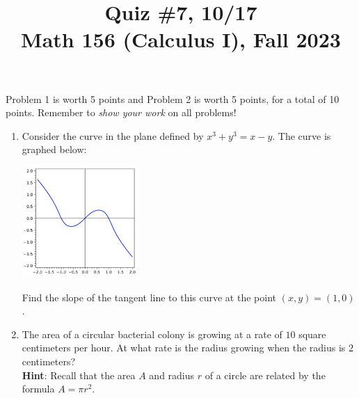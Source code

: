 \documentclass[11pt]{article}
\title{Quiz \#7, 10/17 \\ Math 156 (Calculus I), Fall 2023}
\date{}
\begin{document}
\maketitle

\thispagestyle{empty}

\vspace{-1.75cm}

Problem 1 is worth 5 points and Problem 2 is worth 5 points, for a total of 10 points. Remember to \emph{show your work} on all problems!

\begin{enumerate}
\item Consider the curve in the plane defined by $x^3 + y^3 = x - y$. The curve is graphed below:
\vspace{-0.45cm}
\begin{center}\includegraphics[width=1.75in]{quiz7.png}\end{center}
\vspace{-0.7cm}
Find the slope of the tangent line to this curve at the point $(x,y)=(1,0)$.

\vspace{6.75cm}

\item The area of a circular bacterial colony is growing at a rate of $10$ square centimeters per hour. At what rate is the radius growing when the radius is $2$ centimeters? \\{\bf Hint}: Recall that the area $A$ and radius $r$ of a circle are related by the formula $A=\pi r^2$.
\end{enumerate}
\end{document}
